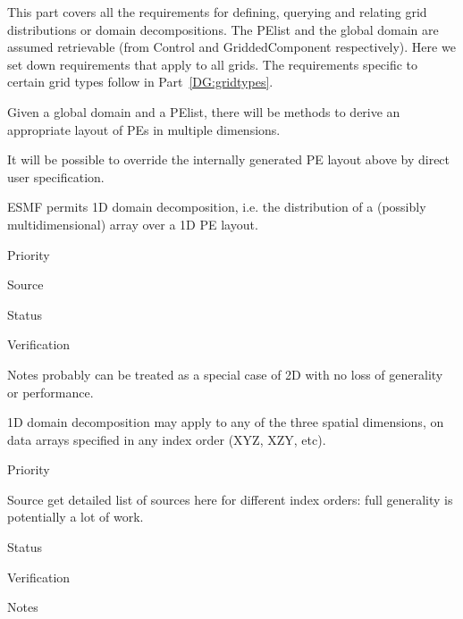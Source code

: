 
This part covers all the requirements for defining, querying and
relating grid distributions or domain decompositions. The PElist and
the global domain are assumed retrievable (from Control and
GriddedComponent respectively). Here we set down requirements that
apply to all grids. The requirements specific to certain grid
types follow in Part~\ref{DG:gridtypes}.



Given a global domain and a PElist, there will be methods to derive an
appropriate layout of PEs in multiple dimensions.


It will be possible to override the internally generated PE layout above
by direct user specification.


ESMF permits 1D domain decomposition, i.e. the distribution of a
(possibly multidimensional) array over a 1D PE layout.

\begin{reqlist}
\item[Priority]
\item[Source]
\item[Status]
\item[Verification]
\item[Notes] probably can be treated as a special case of 2D with no
  loss of generality or performance.
\end{reqlist}


1D domain decomposition may apply to any of the three spatial
dimensions, on data arrays specified in any index order (XYZ, XZY,
etc).

\begin{reqlist}
\item[Priority]
\item[Source] get detailed list of sources here for different index
  orders: full generality is potentially a lot of work.
\item[Status]
\item[Verification]
\item[Notes]
\end{reqlist}



